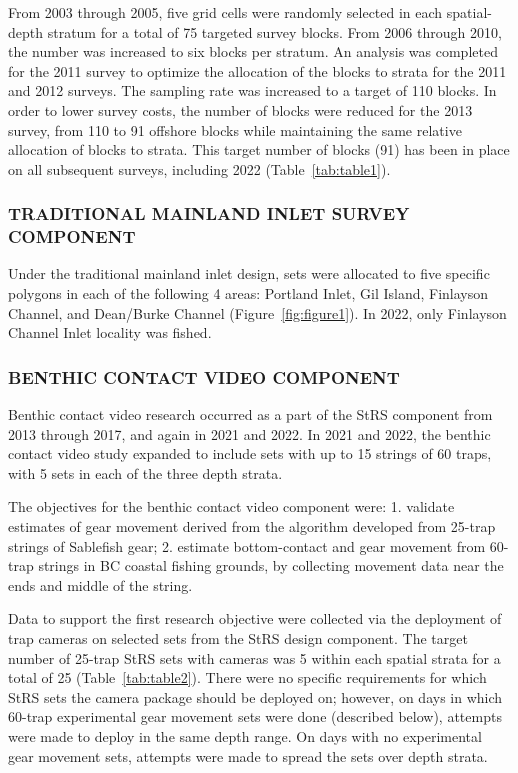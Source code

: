 \documentclass[12pt]{article}\usepackage[]{graphicx}\usepackage[]{color}
\begin{document}
From 2003 through 2005, five grid cells were randomly selected in each spatial-depth stratum for a total of 75 targeted survey blocks. From 2006 through 2010, the number was increased to six blocks per stratum. An analysis was completed for the 2011 survey to optimize the allocation of the blocks to strata for the 2011 and 2012 surveys. The sampling rate was increased to a target of 110 blocks. In order to lower survey costs, the number of blocks were reduced for the 2013 survey, from 110 to 91 offshore blocks while maintaining the same relative allocation of blocks to strata. This target number of blocks (91) has been in place on all subsequent surveys, including 2022 (Table~\ref{tab:table1}).

\hypertarget{trad}{%
\subsubsection{TRADITIONAL MAINLAND INLET SURVEY COMPONENT}\label{trad}}

Under the traditional mainland inlet design, sets were allocated to five specific polygons in each of the following 4 areas: Portland Inlet, Gil Island, Finlayson Channel, and Dean/Burke Channel (Figure~\ref{fig:figure1}). In 2022, only Finlayson Channel Inlet locality was fished.

\hypertarget{gear}{%
\subsubsection{BENTHIC CONTACT VIDEO COMPONENT}\label{gear}}

Benthic contact video research occurred as a part of the StRS component from 2013 through 2017, and again in 2021 and 2022. In 2021 and 2022, the benthic contact video study expanded to include sets with up to 15 strings of 60 traps, with 5 sets in each of the three depth strata.

The objectives for the benthic contact video component were: 1. validate estimates of gear movement derived from the algorithm developed from 25-trap strings of Sablefish gear; 2. estimate bottom-contact and gear movement from 60-trap strings in BC coastal fishing grounds, by collecting movement data near the ends and middle of the string.

Data to support the first research objective were collected via the deployment of trap cameras on selected sets from the StRS design component. The target number of 25-trap StRS sets with cameras was 5 within each spatial strata for a total of 25 (Table~\ref{tab:table2}). There were no specific requirements for which StRS sets the camera package should be deployed on; however, on days in which 60-trap experimental gear movement sets were done (described below), attempts were made to deploy in the same depth range. On days with no experimental gear movement sets, attempts were made to spread the sets over depth strata.
\end{document}
